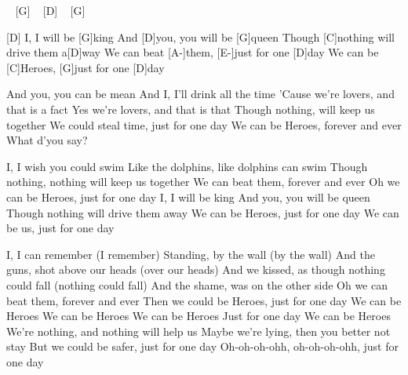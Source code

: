 \begin{guitar}
[D] ~ [G] ~ [D] ~ [G] ~

[D] I, I will be [G]king
And [D]you, you will be [G]queen
Though [C]nothing will drive them a[D]way
We can beat [A-]them, [E-]just for one [D]day
We can be [C]Heroes, [G]just for one [D]day

And you, you can be mean
And I, I'll drink all the time
'Cause we're lovers, and that is a fact
Yes we're lovers, and that is that
Though nothing, will keep us together
We could steal time, just for one day
We can be Heroes, forever and ever
What d'you say?

I, I wish you could swim
Like the dolphins, like dolphins can swim
Though nothing, nothing will keep us together
We can beat them, forever and ever
Oh we can be Heroes, just for one day
I, I will be king
And you, you will be queen
Though nothing will drive them away
We can be Heroes, just for one day
We can be us, just for one day

I, I can remember (I remember)
Standing, by the wall (by the wall)
And the guns, shot above our heads (over our heads)
And we kissed, as though nothing could fall (nothing could fall)
And the shame, was on the other side
Oh we can beat them, forever and ever
Then we could be Heroes, just for one day
We can be Heroes
We can be Heroes
We can be Heroes
Just for one day
We can be Heroes
We're nothing, and nothing will help us
Maybe we're lying, then you better not stay
But we could be safer, just for one day
Oh-oh-oh-ohh, oh-oh-oh-ohh, just for one day 
\end{guitar}